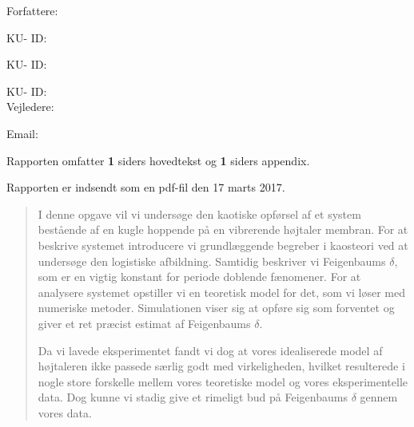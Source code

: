 \documentclass[12pt,oneside,a4paper]{article}
\numberwithin{equation}{section}
\begin{document}
\vfill
{\large Forfattere:}\\
{\large \hspace*{1cm}   \hspace{1cm} KU- ID:  \\
{\large \hspace*{1cm}    \hspace{1cm} KU- ID:  \\
{\large \hspace*{1cm}    \hspace{1cm} KU- ID:  \\

{\large Vejledere:}\\
{\large \hspace*{1cm}   \hspace{1cm} Email:  \\

\vfill

{\large Rapporten omfatter {\bf 1} siders hovedtekst og {\bf 1} siders appendix.}

{\large Rapporten er indsendt som en pdf-fil den 17 marts 2017. }

\normalsize


\newpage
{}
\begin{abstract}
\setlength{\parindent}{0cm}
\setlength{\parskip}{0.3cm}
\noindent I denne opgave vil vi undersøge den kaotiske opførsel af et system bestående af en  kugle hoppende på en vibrerende højtaler membran. For at beskrive systemet introducere vi grundlæggende begreber i kaosteori ved at undersøge den logistiske afbildning. Samtidig beskriver vi Feigenbaums $\delta$, som er en vigtig konstant for periode doblende fænomener. For at analysere systemet opstiller vi en teoretisk model for det, som vi løser med numeriske metoder. Simulationen viser sig at opføre sig som forventet og giver et ret præcist estimat af Feigenbaums $\delta$.

Da vi lavede eksperimentet fandt vi dog at vores idealiserede model af højtaleren ikke passede særlig godt med virkeligheden, hvilket resulterede i nogle store forskelle mellem vores teoretiske model og vores eksperimentelle data. Dog kunne vi stadig give et rimeligt bud på Feigenbaums $\delta$ gennem vores data.



\end{abstract}}}}}
\end{document}
